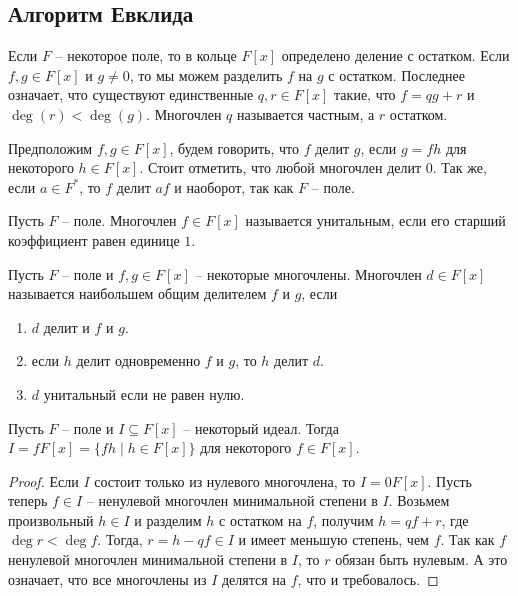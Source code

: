\subsection{Алгоритм Евклида}

Если $F$ -- некоторое поле, то в кольце $F[x]$ определено деление с остатком.
Если $f, g \in F[x]$ и $g\neq 0$, то мы можем разделить $f$ на $g$ с остатком.
Последнее означает, что существуют единственные $q, r\in F[x]$ такие, что $f = q g + r$ и $\deg(r) < \deg (g)$.
Многочлен $q$ называется частным, а $r$ остатком.

Предположим $f, g\in F[x]$, будем говорить, что $f$ делит $g$, если $g = fh$ для некоторого $h\in F[x]$.
Стоит отметить, что любой многочлен делит $0$.
Так же, если $a\in F^*$, то $f$ делит $af$ и наоборот, так как $F$ -- поле.

\begin{definition}
Пусть $F$ -- поле.
Многочлен $f\in F[x]$ называется унитальным, если его старший коэффициент равен единице $1$.
\end{definition}

\begin{definition}
Пусть $F$ -- поле и $f, g\in F[x]$ -- некоторые многочлены.
Многочлен $d\in F[x]$ называется наибольшем общим делителем $f$ и $g$, если
\begin{enumerate}
\item $d$ делит и $f$ и $g$.

\item если $h$ делит одновременно $f$ и $g$, то $h$ делит $d$.

\item $d$ унитальный если не равен нулю.
\end{enumerate}
\end{definition}


\begin{claim}
\label{claim::PolyIdeals}
Пусть $F$ -- поле и $I\subseteq F[x]$ -- некоторый идеал.
Тогда $I = f F[x] = \{fh\mid h\in F[x]\}$ для некоторого $f\in F[x]$.
\end{claim}
\begin{proof}
Если $I$ состоит только из нулевого многочлена, то $I = 0 F[x]$.
Пусть теперь $f\in I$ -- ненулевой многочлен минимальной степени в $I$.
Возьмем произвольный $h\in I$ и разделим $h$ с остатком на $f$, получим $h = qf + r$, где $\deg r < \deg f$.
Тогда, $r = h - qf \in I$ и имеет меньшую степень, чем $f$.
Так как $f$ ненулевой многочлен минимальной степени в $I$, то $r$ обязан быть нулевым.
А это означает, что все многочлены из $I$ делятся на $f$, что и требовалось.
\end{proof}


